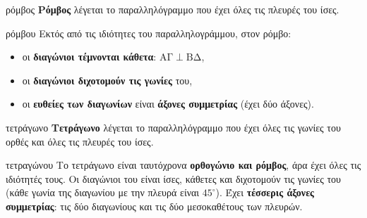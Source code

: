\begin{orismos}{ρόμβος}
\textbf{Ρόμβος} λέγεται το παραλληλόγραμμο που έχει όλες τις πλευρές του ίσες.
\end{orismos}

\begin{idiotita}{ρόμβου}
Εκτός από τις ιδιότητες του παραλληλογράμμου, στον ρόμβο:
\begin{itemize}[leftmargin=1.2em,itemsep=0.3ex,topsep=2pt]
\item οι \textbf{διαγώνιοι τέμνονται κάθετα}: $\mathrm{ΑΓ}\perp\mathrm{ΒΔ}$,
\item οι \textbf{διαγώνιοι διχοτομούν τις γωνίες} του,
\item οι \textbf{ευθείες των διαγωνίων} είναι \textbf{άξονες συμμετρίας} (έχει δύο άξονες).
\end{itemize}
\end{idiotita}

\begin{orismos}{τετράγωνο}
\textbf{Τετράγωνο} λέγεται το παραλληλόγραμμο που έχει όλες τις γωνίες του ορθές και όλες τις πλευρές του ίσες.
\end{orismos}

\begin{idiotita}{τετραγώνου}
Το τετράγωνο είναι ταυτόχρονα \textbf{ορθογώνιο και ρόμβος}, άρα έχει όλες τις ιδιότητές τους. Οι διαγώνιοι του είναι ίσες, κάθετες και διχοτομούν τις γωνίες του (κάθε γωνία της διαγωνίου με την πλευρά είναι $45^\circ$). Έχει \textbf{τέσσερις άξονες συμμετρίας}: τις δύο διαγωνίους και τις δύο μεσοκαθέτους των πλευρών.
\end{idiotita}

\begin{center}
\end{center}

